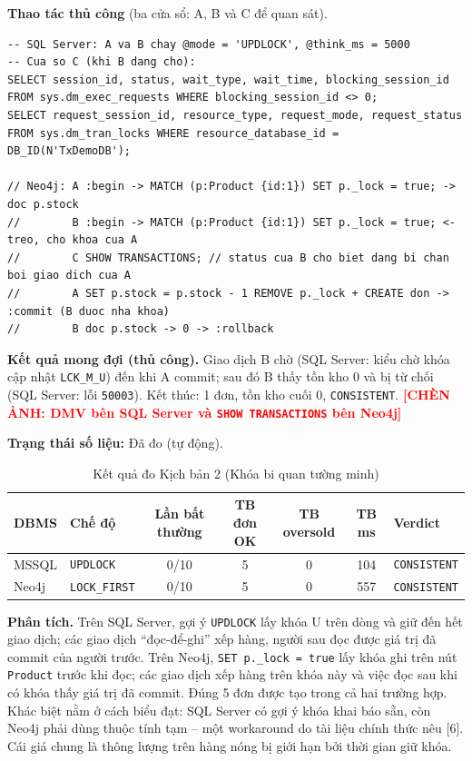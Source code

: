 \textbf{Thao tác thủ công} (ba cửa sổ: A, B và C để quan sát).
\begin{lstlisting}[basicstyle=\ttfamily\small, breaklines=true, frame=single]
-- SQL Server: A va B chay @mode = 'UPDLOCK', @think_ms = 5000
-- Cua so C (khi B dang cho):
SELECT session_id, status, wait_type, wait_time, blocking_session_id
FROM sys.dm_exec_requests WHERE blocking_session_id <> 0;
SELECT request_session_id, resource_type, request_mode, request_status
FROM sys.dm_tran_locks WHERE resource_database_id = DB_ID(N'TxDemoDB');

// Neo4j: A :begin -> MATCH (p:Product {id:1}) SET p._lock = true; -> doc p.stock
//        B :begin -> MATCH (p:Product {id:1}) SET p._lock = true; <- treo, cho khoa cua A
//        C SHOW TRANSACTIONS; // status cua B cho biet dang bi chan boi giao dich cua A
//        A SET p.stock = p.stock - 1 REMOVE p._lock + CREATE don -> :commit (B duoc nha khoa)
//        B doc p.stock -> 0 -> :rollback
\end{lstlisting}

\textbf{Kết quả mong đợi (thủ công).} Giao dịch B chờ (SQL Server: kiểu chờ khóa cập nhật \texttt{LCK\_M\_U}) đến khi A commit; sau đó B thấy tồn kho 0 và bị từ chối (SQL Server: lỗi \texttt{50003}). Kết thúc: 1 đơn, tồn kho cuối 0, \texttt{CONSISTENT}. \textcolor{red}{\textbf{[CHÈN ẢNH: DMV bên SQL Server và \texttt{SHOW TRANSACTIONS} bên Neo4j]}}

\textbf{Trạng thái số liệu:} Đã đo (tự động).

\begin{table}[htbp]
\centering
\caption{Kết quả đo Kịch bản 2 (Khóa bi quan tường minh)}
\label{tab:tx-kb2}
\renewcommand{\arraystretch}{1.2}
\begin{tabularx}{\textwidth}{l l c c c c X}
\toprule
\textbf{DBMS} & \textbf{Chế độ} & \textbf{Lần bất thường} & \textbf{TB đơn OK} & \textbf{TB oversold} & \textbf{TB ms} & \textbf{Verdict} \\
\midrule
MSSQL & \texttt{UPDLOCK} & 0/10 & 5 & 0 & 104 & \texttt{CONSISTENT} \\
Neo4j & \texttt{LOCK\_FIRST} & 0/10 & 5 & 0 & 557 & \texttt{CONSISTENT} \\
\bottomrule
\end{tabularx}
\end{table}

\textbf{Phân tích.} Trên SQL Server, gợi ý \texttt{UPDLOCK} lấy khóa U trên dòng và giữ đến hết giao dịch; các giao dịch ``đọc-để-ghi'' xếp hàng, người sau đọc được giá trị đã commit của người trước. Trên Neo4j, \texttt{SET p.\_lock = true} lấy khóa ghi trên nút \texttt{Product} trước khi đọc; các giao dịch xếp hàng trên khóa này và việc đọc sau khi có khóa thấy giá trị đã commit. Đúng 5 đơn được tạo trong cả hai trường hợp. Khác biệt nằm ở cách biểu đạt: SQL Server có gợi ý khóa khai báo sẵn, còn Neo4j phải dùng thuộc tính tạm -- một workaround do tài liệu chính thức nêu [6]. Cái giá chung là thông lượng trên hàng nóng bị giới hạn bởi thời gian giữ khóa.

